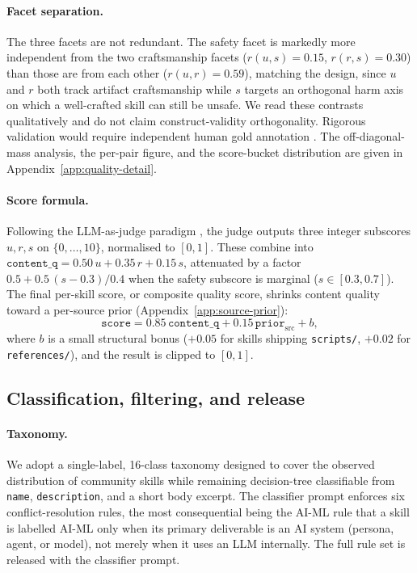 \paragraph{Facet separation.}
The three facets are not redundant.  The safety facet is markedly
more independent from the two craftsmanship facets
($r(u,s){=}0.15$, $r(r,s){=}0.30$) than those are from each other
($r(u,r){=}0.59$), matching the design, since $u$ and $r$ both
track artifact craftsmanship while $s$ targets an orthogonal harm
axis on which a well-crafted skill can still be unsafe.  We read
these contrasts qualitatively and do not claim construct-validity
orthogonality.  Rigorous validation would require independent human
gold annotation \citep{SkillNet2026}.  The off-diagonal-mass
analysis, the per-pair figure, and the score-bucket distribution
are given in Appendix~\ref{app:quality-detail}.

\paragraph{Score formula.}
Following the LLM-as-judge paradigm \citep{Zheng2023LLMJudge},
the judge outputs three integer subscores $u, r, s$ on
$\{0, \ldots, 10\}$, normalised to $[0, 1]$.  These combine into
$\mathtt{content\_q} = 0.50\,u + 0.35\,r + 0.15\,s$, attenuated by
a factor $0.5 + 0.5\,(s{-}0.3)/0.4$ when the safety subscore is
marginal ($s \in [0.3, 0.7]$).  The final per-skill score, or composite quality score, shrinks
content quality toward a per-source prior
(Appendix~\ref{app:source-prior}):
\[
\mathtt{score} = 0.85\,\mathtt{content\_q} + 0.15\,\mathtt{prior}_{\mathrm{src}} + b,
\]
where $b$ is a small structural bonus
($+0.05$ for skills shipping \texttt{scripts/},
$+0.02$ for \texttt{references/}), and the result is clipped to
$[0, 1]$.

\subsection{Classification, filtering, and release}
\label{sec:classify}

\paragraph{Taxonomy.}
We adopt a single-label, 16-class taxonomy designed to cover the
observed distribution of community skills while remaining
decision-tree classifiable from \texttt{name},
\texttt{description}, and a short body excerpt.  The classifier
prompt enforces six conflict-resolution rules, the most
consequential being the \textsc{AI-ML} rule that a skill is
labelled \textsc{AI-ML} only when its primary deliverable is an AI
system (persona, agent, or model), not merely when it uses an LLM
internally.  The full rule set is released with the classifier
prompt.

